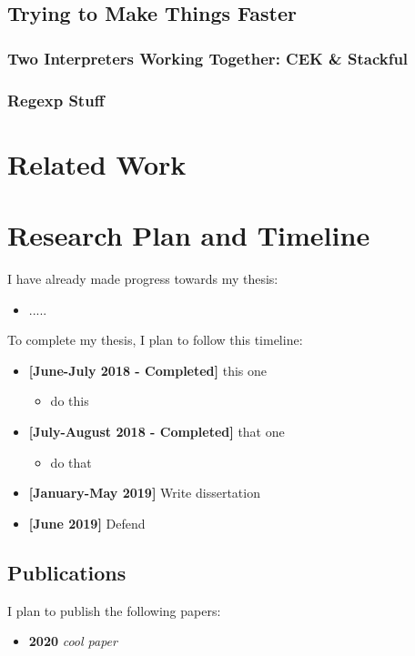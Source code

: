 \documentclass[9pt]{extarticle}
\begin{document}
\subsection{Trying to Make Things Faster}

\subsubsection{Two Interpreters Working Together: CEK \& Stackful}

\subsubsection{Regexp Stuff}

\section{Related Work}



\section{Research Plan and Timeline}

I have already made progress towards my thesis:

\begin{itemize}
  \item .....
\end{itemize}

To complete my thesis, I plan to follow this timeline:

\begin{itemize}
  \item \textbf{[June-July 2018 - Completed]} this one
    \begin{itemize}
    \item do this
    \end{itemize}
  \item \textbf{[July-August 2018 - Completed]} that one
    \begin{itemize}
      \item do that
    \end{itemize}
  \item \textbf{[January-May 2019]} Write dissertation
  \item \textbf{[June 2019]} Defend
\end{itemize}

\subsection{Publications}

I plan to publish the following papers:

\begin{itemize}
  \item \textbf{2020} \emph{cool paper}
\end{itemize}

\printbibliography
\end{document}
